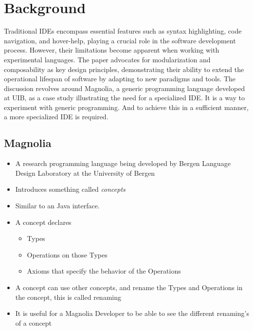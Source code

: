 \chapter{Background}

Traditional IDEs encompass essential features such as syntax highlighting, code
navigation, and hover-help, playing a crucial role in the software development
process. However, their limitations become apparent when working with
experimental languages. The paper advocates for modularization and composability
as key design principles, demonstrating their ability to extend the operational
lifespan of software by adapting to new paradigms and tools. The discussion
revolves around Magnolia, a generic programming language developed at UIB, as a
case study illustrating the need for a specialized IDE. It is a way to experiment
with generic programming. And to achieve this in a sufficient manner, a more
specialized IDE is required.

\section{Magnolia}

\begin{itemize}
  \item A research programming language being developed by
    Bergen Language Design Laboratory at the University of Bergen

  \item Introduces something called \textit{concepts}

  \item Similar to an Java interface.

  \item A concept declares
    \begin{itemize}
      \item Types

      \item Operations on those Types

      \item Axioms that specify the behavior of the Operations
    \end{itemize}

  \item A concept can use other concepts, and rename the Types and Operations
    in the concept, this is called renaming

  \item It is useful for a Magnolia Developer to be able to see the different
    renaming's of a concept
\end{itemize}

